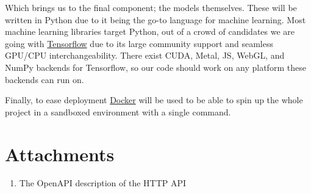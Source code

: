 \documentclass{article}
\begin{document}
Which brings us to the final component; the models themselves. These will be written in Python due to it being the go-to language for machine learning. Most machine learning libraries target Python, out of a crowd of candidates we are going with \href{https://www.tensorflow.org/}{Tensorflow} due to its large community support and seamless GPU/CPU interchangeability. There exist CUDA, Metal, JS, WebGL, and NumPy backends for Tensorflow, so our code should work on any platform these backends can run on.

Finally, to ease deployment \href{https://www.docker.com/}{Docker} will be used to be able to spin up the whole project in a sandboxed environment with a single command.

\newpage
\section{Attachments}

\begin{enumerate}
    \item \label{att:openapi} The OpenAPI description of the HTTP API
\end{enumerate}


\printbibliography
\end{document}

